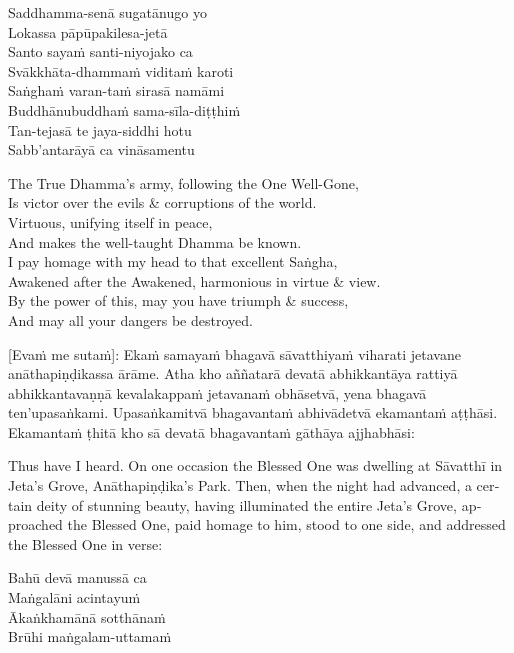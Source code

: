 Saddhamma-senā sugatānugo yo\\
Lokassa pāpūpakilesa-jetā\\
Santo sayaṁ santi-niyojako ca\\
Svākkhāta-dhammaṁ viditaṁ karoti\\
Saṅghaṁ varan-taṁ sirasā namāmi\\
Buddhānubuddhaṁ sama-sīla-diṭṭhiṁ\\
Tan-tejasā te jaya-siddhi hotu\\
Sabb’antarāyā ca vināsamentu

\begin{english}
  The True Dhamma's army, following the One Well-Gone,\\
  Is victor over the evils \& corruptions of the world.\\
  Virtuous, unifying itself in peace,\\
  And makes the well-taught Dhamma be known.\\
  I pay homage with my head to that excellent Saṅgha,\\
  Awakened after the Awakened, harmonious in virtue \& view.\\
  By the power of this, may you have triumph \& success,\\
  And may all your dangers be destroyed.
\end{english}

\suttaRef{[Thai]}

[Evaṁ me sutaṁ]: Ekaṁ samayaṁ bhagavā sāvatthiyaṁ viharati jetavane anāthapiṇḍikassa ārāme. Atha kho aññatarā devatā abhikkantāya rattiyā abhikkantavaṇṇā kevalakappaṁ jetavanaṁ obhāsetvā, yena bhagavā ten’upasaṅkami. Upasaṅkamitvā bhagavantaṁ abhivādetvā ekamantaṁ aṭṭhāsi. Ekamantaṁ ṭhitā kho sā devatā bhagavantaṁ gāthāya ajjhabhāsi:

\begin{english}
  Thus have I heard. On one occasion the Blessed One was dwelling at Sāvatthī in Jeta’s Grove, Anāthapiṇḍika’s Park. Then, when the night had advanced, a certain deity of stunning beauty, having illuminated the entire Jeta’s Grove, approached the Blessed One, paid homage to him, stood to one side, and addressed the Blessed One in verse:
\end{english}

Bahū devā manussā ca\\
Maṅgalāni acintayuṁ\\
Ākaṅkhamānā sotthānaṁ\\
Brūhi maṅgalam-uttamaṁ

